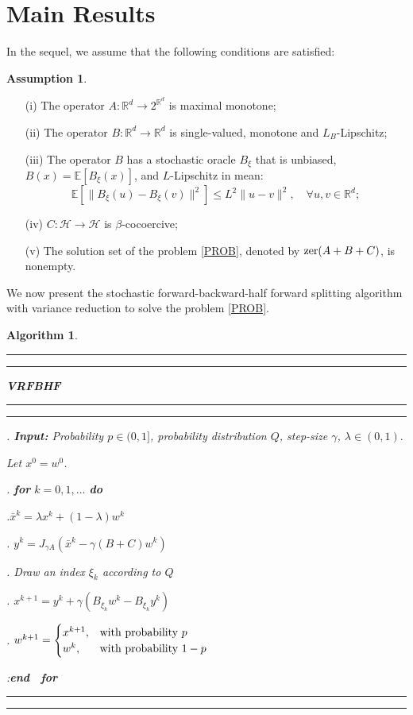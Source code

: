 \documentclass[a4paper,12pt]{article}
\newtheorem{alg}[dfn]{Algorithm}
\theoremstyle{definition}
\newtheorem{asm}[dfn]{Assumption}
\begin{document}
\section{Main Results}\label{main}
In the sequel, we assume that the following conditions are satisfied:
\begin{asm} \label{CON1}
	\begin{itemize}
		\item[(i)] The operator $A: \mathbb{R}^d\to 2^{\mathbb{R}^d}$ is maximal monotone;
        \item[(ii)] The operator $B: \mathbb{R}^d\to \mathbb{R}^d$ is single-valued, monotone and $L_B$-Lipschitz;
        \item[(iii)] The operator $B$ has a stochastic oracle $B_\xi$ that is unbiased, $B(x)=\mathbb{E}[B_{\xi}(x)]$, and $L$-Lipschitz in mean:
        \begin{equation}
        \label{lip}
        \mathbb{E}[\|B_{\xi}(u)-B_{\xi}(v)\|^2] \leq L^2\|u-v\|^2, \quad \forall u,v \in \mathbb{R}^d;
        \end{equation}
		\item[(iv)] $C: \mathcal{H}\to \mathcal{H}$ is $\beta$-cocoercive;
		\item[(v)] The solution set  of the problem \eqref{PROB}, denoted by ${\rm zer}(A+B+C)$, is nonempty.
	\end{itemize}
\end{asm}

\noindent
We now present the stochastic forward-backward-half forward splitting algorithm with variance reduction to solve the  problem \eqref{PROB}.

\begin{alg}\label{ALG}
{\rm
\hrule\hrule
\vskip 1mm
\noindent\textbf{VRFBHF}
\vskip 1mm
\hrule\hrule


\vskip 1mm


. {\bf Input:} Probability $p \in (0, 1]$, probability distribution $Q$, step-size $\gamma$, $\lambda \in (0, 1).$

Let $x^0 = w^0$.

. {\bf for} $k = 0, 1, \ldots$ {\bf do}

.\quad  $\bar x^k=\lambda x^k+(1-\lambda)w^k$


.\quad
$
y^k = J_{\gamma A}\left(\bar x^k - \gamma(B+C)w^k\right)
$

.\quad
Draw an index $\xi_k$ according to $Q$

.\quad
$
x^{k+1}=y^k+\gamma(B_{\xi_k}w^k-B_{\xi_k}y^k)
$

.\quad
$
w^{k+1}=
\begin{cases}
x^{k+1},&\hbox{with probability}\,\,p\\
w^k,&\hbox{with probability}\,\,1-p\\
\end{cases}
$

:\quad \textbf{end \ for}
\vskip 1mm
}
\hrule\hrule
\hspace*{\fill}
\end{alg}
\end{document}
